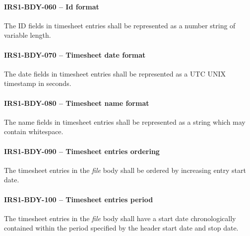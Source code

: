 \paragraph{IRS1-BDY-060 -- Id format}
The ID fields in timesheet entries shall be represented as a number string
of variable length.

\paragraph{IRS1-BDY-070 -- Timesheet date format}
The date fields in timesheet entries shall be represented as a \gls{UTC}
UNIX timestamp in seconds.

\paragraph{IRS1-BDY-080 -- Timesheet name format}
The name fields in timesheet entries shall be represented as a string
which may contain whitespace.

\paragraph{IRS1-BDY-090 -- Timesheet entries ordering}
The timesheet entries in the \emph{file} body shall be ordered by
increasing entry start date.

\paragraph{IRS1-BDY-100 -- Timesheet entries period}
The timesheet entries in the \emph{file} body shall have a
start date chronologically contained within the period specified
by the header start date and stop date.
